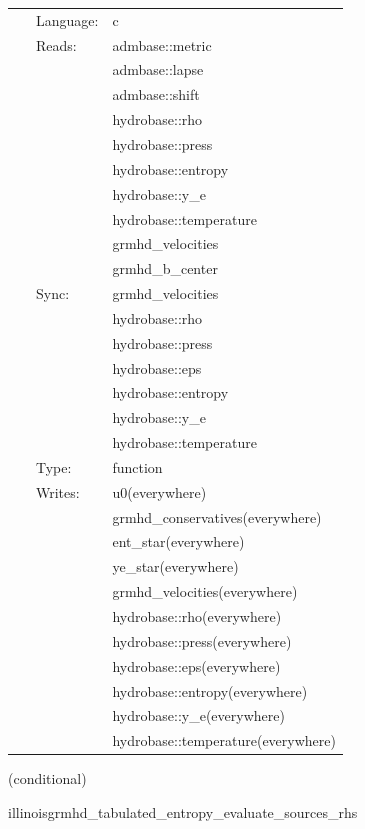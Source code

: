 \documentclass{article}
\begin{document}
\hspace{5mm}

 \begin{tabular*}{160mm}{cll} 
~ & Language:  & c \\ 
~ & Reads:  & admbase::metric \\ 
~& ~ &admbase::lapse\\ 
~& ~ &admbase::shift\\ 
~& ~ &hydrobase::rho\\ 
~& ~ &hydrobase::press\\ 
~& ~ &hydrobase::entropy\\ 
~& ~ &hydrobase::y\_e\\ 
~& ~ &hydrobase::temperature\\ 
~& ~ &grmhd\_velocities\\ 
~& ~ &grmhd\_b\_center\\ 
~ & Sync:  & grmhd\_velocities \\ 
~& ~ &hydrobase::rho\\ 
~& ~ &hydrobase::press\\ 
~& ~ &hydrobase::eps\\ 
~& ~ &hydrobase::entropy\\ 
~& ~ &hydrobase::y\_e\\ 
~& ~ &hydrobase::temperature\\ 
~ & Type:  & function \\ 
~ & Writes:  & u0(everywhere) \\ 
~& ~ &grmhd\_conservatives(everywhere)\\ 
~& ~ &ent\_star(everywhere)\\ 
~& ~ &ye\_star(everywhere)\\ 
~& ~ &grmhd\_velocities(everywhere)\\ 
~& ~ &hydrobase::rho(everywhere)\\ 
~& ~ &hydrobase::press(everywhere)\\ 
~& ~ &hydrobase::eps(everywhere)\\ 
~& ~ &hydrobase::entropy(everywhere)\\ 
~& ~ &hydrobase::y\_e(everywhere)\\ 
~& ~ &hydrobase::temperature(everywhere)\\ 
\end{tabular*} 


\vspace{5mm}

   (conditional) 

\hspace{5mm} illinoisgrmhd\_tabulated\_entropy\_evaluate\_sources\_rhs 
\end{document}
